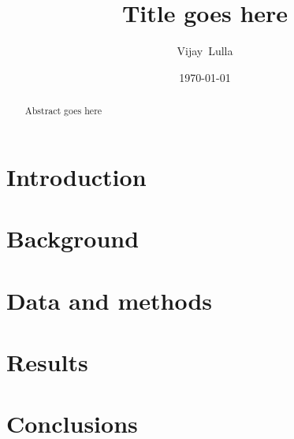 \documentclass[letterpaper]{article}
\title{Title goes here}
\author{Vijay~Lulla}
\date{\today}
\begin{document}
\maketitle

\begin{abstract}
Abstract goes here
\end{abstract}

\section{Introduction}
\label{sec:introduction}

\section{Background}
\label{sec:background}

\section{Data and methods}
\label{sec:data-and-methods}

\section{Results}
\label{sec:results}

\section{Conclusions}
\label{sec:conclusions}

\end{document}
